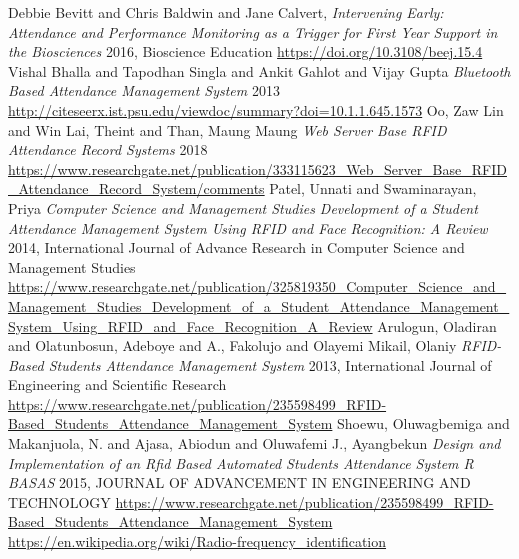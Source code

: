 \documentclass[declaration,shortabstract, mgr]{iithesis}
\begin{document}
\begin{thebibliography}{9}
		Debbie Bevitt and Chris Baldwin and Jane Calvert,
		\textit{Intervening Early: Attendance and Performance Monitoring as a Trigger for First Year Support in the Biosciences}
		2016, Bioscience Education
		\url{https://doi.org/10.3108/beej.15.4}
		Vishal Bhalla and Tapodhan Singla and Ankit Gahlot and Vijay Gupta
		\textit{Bluetooth Based Attendance Management System}
		2013
		\url{http://citeseerx.ist.psu.edu/viewdoc/summary?doi=10.1.1.645.1573}
		Oo, Zaw Lin and Win Lai, Theint and Than, Maung Maung
		\textit{Web Server Base RFID Attendance Record Systems}
		2018
		\url{https://www.researchgate.net/publication/333115623_Web_Server_Base_RFID_Attendance_Record_System/comments}
		Patel, Unnati and Swaminarayan, Priya
		\textit{Computer Science and Management Studies Development of a Student Attendance Management System Using RFID and Face Recognition: A Review}
		2014, International Journal of Advance Research in Computer Science and Management Studies
		\url{https://www.researchgate.net/publication/325819350_Computer_Science_and_Management_Studies_Development_of_a_Student_Attendance_Management_System_Using_RFID_and_Face_Recognition_A_Review}
		Arulogun, Oladiran and Olatunbosun, Adeboye and A., Fakolujo and Olayemi Mikail, Olaniy
		\textit{RFID-Based Students Attendance Management System}
		2013, International Journal of Engineering and Scientific Research
		\url{https://www.researchgate.net/publication/235598499_RFID-Based_Students_Attendance_Management_System}
		Shoewu, Oluwagbemiga and Makanjuola, N. and Ajasa, Abiodun and Oluwafemi J., Ayangbekun
		\textit{Design and Implementation of an Rfid Based Automated Students Attendance System R BASAS}
		2015, JOURNAL OF ADVANCEMENT IN ENGINEERING AND TECHNOLOGY
		\url{https://www.researchgate.net/publication/235598499_RFID-Based_Students_Attendance_Management_System}
		\url{https://en.wikipedia.org/wiki/Radio-frequency_identification}
\end{thebibliography}
\end{document}
